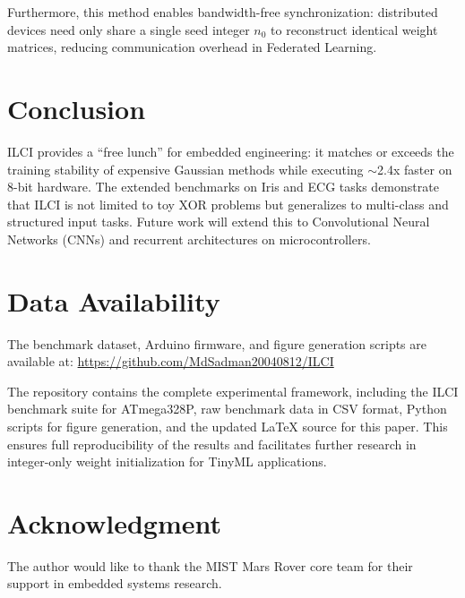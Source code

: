 \documentclass[conference]{IEEEtran}
\begin{document}
Furthermore, this method enables bandwidth-free synchronization: distributed devices need only share a single seed integer $n_0$ to reconstruct identical weight matrices, reducing communication overhead in Federated Learning.

\section{Conclusion}
ILCI provides a ``free lunch'' for embedded engineering: it matches or exceeds the training stability of expensive Gaussian methods while executing $\sim$2.4x faster on 8-bit hardware. The extended benchmarks on Iris and ECG tasks demonstrate that ILCI is not limited to toy XOR problems but generalizes to multi-class and structured input tasks. Future work will extend this to Convolutional Neural Networks (CNNs) and recurrent architectures on microcontrollers.

\section*{Data Availability}
The benchmark dataset, Arduino firmware, and figure generation scripts are available at:
\url{https://github.com/MdSadman20040812/ILCI}

The repository contains the complete experimental framework, including the ILCI benchmark suite for ATmega328P, raw benchmark data in CSV format, Python scripts for figure generation, and the updated LaTeX source for this paper. This ensures full reproducibility of the results and facilitates further research in integer-only weight initialization for TinyML applications.

\section*{Acknowledgment}
The author would like to thank the MIST Mars Rover core team for their support in embedded systems research.



\end{document}
